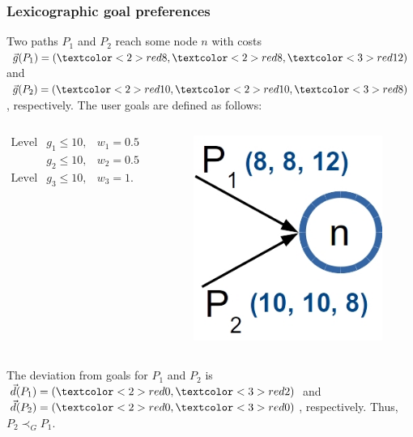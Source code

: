 \begin{frame}
\frametitle{Lexicographic goal preferences}
	\begin{example}
		\vspace{1mm}
		Two paths $P_1$ and $P_2$ reach some node $n$ with costs $\vec g(P_1) = (\textcolor<2>{red}{8}, \textcolor<2>{red}{8}, \textcolor<3>{red}{12})$ and $\vec g(P_2) = (\textcolor<2>{red}{10}, \textcolor<2>{red}{10}, \textcolor<3>{red}{8})$, respectively. The user goals are defined as follows:
		\vspace{1mm}		
	\end{example}
	\vspace{-4mm}
	\begin{columns}[onlytextwidth, t]
	\column{0.5\linewidth}
	\vspace{4mm}
    \begin{equation*}
     \begin{array}{cll}
     	\textrm{Level 1:} & g_1 \leq 10, & w_1 = 0.5 \\
     					  & g_2 \leq 10, & w_2 = 0.5 \\ 
       	\textrm{Level 2:} & g_3 \leq 10, & w_3 = 1.
     \end{array}
   \end{equation*}	
	\column{0.5\linewidth}
    \begin{figure}
    \centering
    		\includegraphics[scale=0.3]{figs/optimality-principle}
  	\end{figure}
	\end{columns}     
   \begin{example}
		\vspace{1mm}	
		The deviation from goals for $P_1$ and $P_2$ is $\vec d(P_1) = (\textcolor<2>{red}{0}, \textcolor<3>{red}{2})$ and $\vec d(P_2) = (\textcolor<2>{red}{0}, \textcolor<3>{red}{0})$, respectively. Thus, \textcolor{ao}{$P_2 \prec_G P_1$}.
		\vspace{1mm}	
	\end{example}
\note{}
\end{frame}
